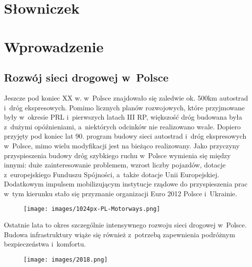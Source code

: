 \setcounter{tocdepth}{2}
\tableofcontents


\chapter{Słowniczek}
\printglossaries

\chapter{Wprowadzenie}
\section{Rozwój sieci drogowej w~Polsce}

Jeszcze pod koniec XX w. w~Polsce znajdowało się zaledwie ok. 500km autostrad i~dróg ekspresowych. Pomimo licznych planów rozwojowych, które przyjmowane były w~okresie PRL i~pierwszych latach III RP, większość dróg budowana była z~dużymi opóźnieniami, a~niektórych odcinków nie realizowano wcale.\newline
Dopiero przyjęty pod koniec lat 90. program budowy sieci autostrad i~dróg ekspresowych w~Polsce, mimo wielu modyfikacji jest na bieżąco realizowany. Jako przyczyny\cite{siec-drogowa-IIIrp} przyspieszenia budowy dróg szybkiego ruchu w~Polsce wymienia się między innymi: duże zainteresowanie problemem, wzrost liczby pojazdów, dotacje z~europejskiego Funduszu Spójności, a~także dotacje Unii Europejskiej. Dodatkowym impulsem mobilizującym instytucje rządowe do przyspieszenia prac w~tym kierunku stało się przyznanie organizacji Euro 2012 Polsce i~Ukrainie.\newline
\begin{figure}[h]
\texttt{[image: images/1024px-PL-Motorways.png]}
\end{figure} \newline
Ostatnie lata to okres szczególnie intensywnego rozwoju sieci drogowej w~Polsce. Budowa infrastruktury wiąże się również z~potrzebą zapewnienia podróżnym bezpieczeństwa i~komfortu.
\begin{figure}[h]
\texttt{[image: images/2018.png]}
\end{figure}

